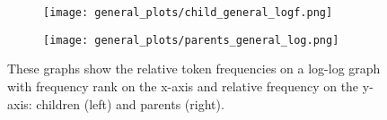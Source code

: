 \documentclass{article}
\theoremstyle{plain}
\theoremstyle{definition}
\theoremstyle{remark}
\numberwithin{equation}{section}
\begin{document}
\begin{figure}[H]
\begin{subfigure}[b]{0.5\textwidth}
    \centering
    \texttt{[image: general\_plots/child\_general\_logf.png]}
\caption{}
    \label{fig:child_log}
\end{subfigure}
\hfill
\begin{subfigure}[b]{0.5\textwidth}
\centering
    \texttt{[image: general\_plots/parents\_general\_log.png]}
\caption{}
    \label{fig:parent_log}
\end{subfigure}
   \caption{These graphs show the relative token frequencies on a log-log graph with frequency rank on the x-axis and relative frequency on the y-axis: children (left) and parents (right).}
    \label{fig:general_log}
\end{figure}
\end{document}

